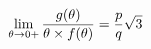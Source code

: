 \documentclass[preview]{standalone}
\begin{document}
\begin{align*}
\lim_{\theta \to 0 +} {g( \theta ) \over \theta \times f( \theta )} = {p \over q} \sqrt{3}
\end{align*}
\end{document}
